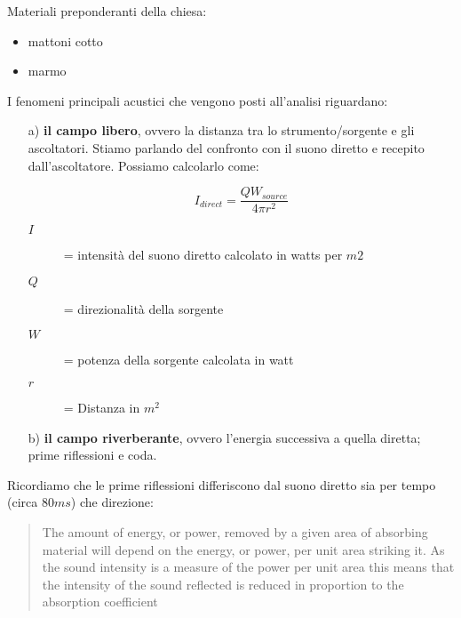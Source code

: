 Materiali preponderanti della chiesa:

\begin{itemize}
	\item mattoni cotto
	\item marmo
\end{itemize}

I fenomeni principali acustici che vengono posti all'analisi riguardano:

\begin{enumerate}
	\item[a)] \textbf{il campo libero}, ovvero la distanza tra lo strumento/sorgente e gli ascoltatori. 
Stiamo parlando del confronto con il suono diretto e recepito dall'ascoltatore. Possiamo calcolarlo come:

\begin{equation}
I_{direct} = \frac{QW_{source}}{4\pi r^2}
\end{equation}

	\begin{description}
		\item[$I$] = intensità del suono diretto calcolato in watts per $m2$
		\item[$Q$] = direzionalità della sorgente 
		\item[$W$] = potenza della sorgente calcolata in watt 
		\item[$r$] = Distanza in $m^2$
	\end{description}
		
	\item[b)] \textbf{il campo riverberante}, ovvero l'energia successiva a quella diretta; prime riflessioni e coda.

\end{enumerate}

Ricordiamo che le prime riflessioni differiscono dal suono diretto sia per tempo (circa $80ms$) che direzione:


\begin{quote}

The amount of energy, or power, removed by a given area of absorbing material will depend on the energy,
or power, per unit area striking it. As the sound intensity is a measure of the power per unit area this
means that the intensity of the sound reflected is reduced in proportion to the absorption
coefficient%

\end{quote}

